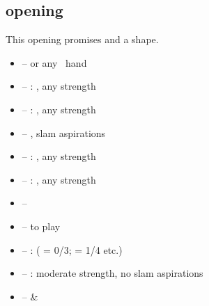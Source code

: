 \subsection{\ctr{1\nt} opening}
\label{subsec:1nt-op}

This opening promises  and a \bal\/ shape. \vspace{1em}

\begin{itemize}
  \item \ctr{2\c} -- \hyperref[subsec:stayman]{}  or any \inv\ hand
  \item \ctr{2\d} -- : , any strength
  \item \ctr{2\h} -- : , any strength
  \item \ctr{2\s} -- \hyperref[subsec:minor-stayman]{} , slam aspirations
  \item \ctr{2\nt} -- : , any strength
  \item \ctr{3\c} -- : , any strength
  \item \ctr{3\d/\major} -- \question
  \item \ctr{3\nt} -- \nat\/ to play
  \item \ctr{4\c} -- :  ( = 0/3;  = 1/4 etc.)
  \item \ctr{4\d/\h} -- :  moderate strength, no slam aspirations
  \item \ctr{4\s} --  \&  \question
\end{itemize}
